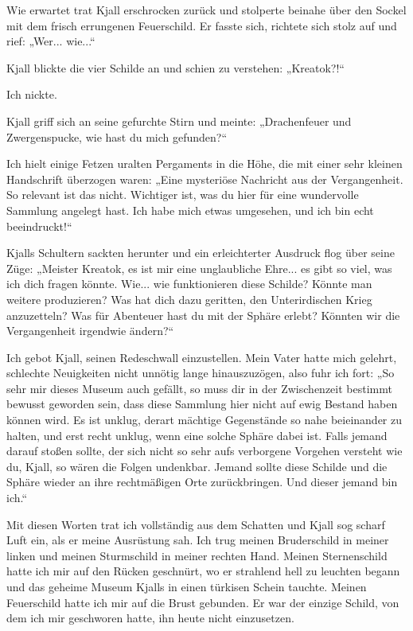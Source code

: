 \documentclass[10pt, a4paper, oneside]{book}
\begin{document}
Wie erwartet trat Kjall erschrocken zurück und stolperte beinahe über den Sockel mit dem frisch errungenen Feuerschild. Er fasste sich, richtete sich stolz auf und rief: „Wer... wie...“

Kjall blickte die vier Schilde an und schien zu verstehen: „Kreatok?!“

Ich nickte.

Kjall griff sich an seine gefurchte Stirn und meinte: „Drachenfeuer und Zwergenspucke, wie hast du mich gefunden?“

Ich hielt einige Fetzen uralten Pergaments in die Höhe, die mit einer sehr kleinen Handschrift überzogen waren: „Eine mysteriöse Nachricht aus der Vergangenheit. So relevant ist das nicht. Wichtiger ist, was du hier für eine wundervolle Sammlung angelegt hast. Ich habe mich etwas umgesehen, und ich bin echt beeindruckt!“

Kjalls Schultern sackten herunter und ein erleichterter Ausdruck flog über seine Züge: „Meister Kreatok, es ist mir eine unglaubliche Ehre... es gibt so viel, was ich dich fragen könnte. Wie... wie funktionieren diese Schilde? Könnte man weitere produzieren? Was hat dich dazu geritten, den Unterirdischen Krieg anzuzetteln? Was für Abenteuer hast du mit der Sphäre erlebt? Könnten wir die Vergangenheit irgendwie ändern?“

Ich gebot Kjall, seinen Redeschwall einzustellen. Mein Vater hatte mich gelehrt, schlechte Neuigkeiten nicht unnötig lange hinauszuzögen, also fuhr ich fort: „So sehr mir dieses Museum auch gefällt, so muss dir in der Zwischenzeit bestimmt bewusst geworden sein, dass diese Sammlung hier nicht auf ewig Bestand haben können wird. Es ist unklug, derart mächtige Gegenstände so nahe beieinander zu halten, und erst recht unklug, wenn eine solche Sphäre dabei ist. Falls jemand darauf stoßen sollte, der sich nicht so sehr aufs verborgene Vorgehen versteht wie du, Kjall, so wären die Folgen undenkbar. Jemand sollte diese Schilde und die Sphäre wieder an ihre rechtmäßigen Orte zurückbringen. Und dieser jemand bin ich.“

Mit diesen Worten trat ich vollständig aus dem Schatten und Kjall sog scharf Luft ein, als er meine Ausrüstung sah. Ich trug meinen Bruderschild in meiner linken und meinen Sturmschild in meiner rechten Hand. Meinen Sternenschild hatte ich mir auf den Rücken geschnürt, wo er strahlend hell zu leuchten begann und das geheime Museum Kjalls in einen türkisen Schein tauchte. Meinen Feuerschild hatte ich mir auf die Brust gebunden. Er war der einzige Schild, von dem ich mir geschworen hatte, ihn heute nicht einzusetzen.
\end{document}
